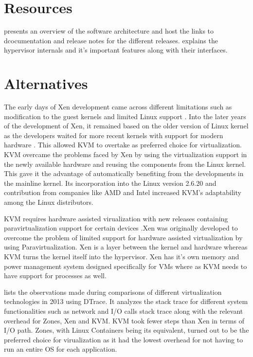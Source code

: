 \documentclass[9pt,twocolumn,twoside]{../../styles/osajnl}
\begin{document}
\section{Resources}

\cite{www-xen-resources} presents an overview of the software architecture and host the links to dcocumentation and release notes for the different releases. \cite{www-xen-book}  explains the hypervisor internals and it's important features along with their interfaces. 

\section{Alternatives}

 The early days of Xen development  came across different limitations such as modification to the guest kernels and limited Linux support \cite{www-kvm-evolution}. Into the later years of the development of Xen, it remained based on the older version of Linux kernel as the developers waited for more recent kernels with support for modern hardware \cite{www-kvm-rise}. This allowed KVM to overtake as preferred choice for virtualization. KVM overcame the problems faced by Xen by using the virtualization support in the newly available hardware and reusing the components from the Linux kernel. This gave it the advantage of automatically benefiting from the developments in the mainline kernel. Its incorporation into the Linux version 2.6.20 and contribution from companies like AMD and Intel increased KVM's adaptability among the Linux distributors.

KVM requires hardware assisted virualization with new releases containing paravirtualization support for certain devices \cite{www-kvm-wiki}.Xen was originally developed to overcome the problem of limited support for hardware assisted virtualization \cite{www-xen-pvh} by using Paravirtualization. Xen is a layer between the kernel and hardware whereas KVM turns the kernel itself into the hypervisor. Xen has it's own memory and power management system designed specifically for VMs where as KVM needs to have support for processes as well.

\cite{www-tech-comparison} lists the observations made during comparisons of different virtualization technologies in 2013 using DTrace. It analyzes the stack trace for different system functionalities such as network and I/O calls stack trace along with the relevant overhead for Zones, Xen and KVM. KVM took fewer steps than Xen in terms of I/O path. Zones, with Linux Containers being its equivalent, turned out to be the preferred choice for virualization as it had the lowest overhead for not having to run an entire OS for each application.
\end{document}
